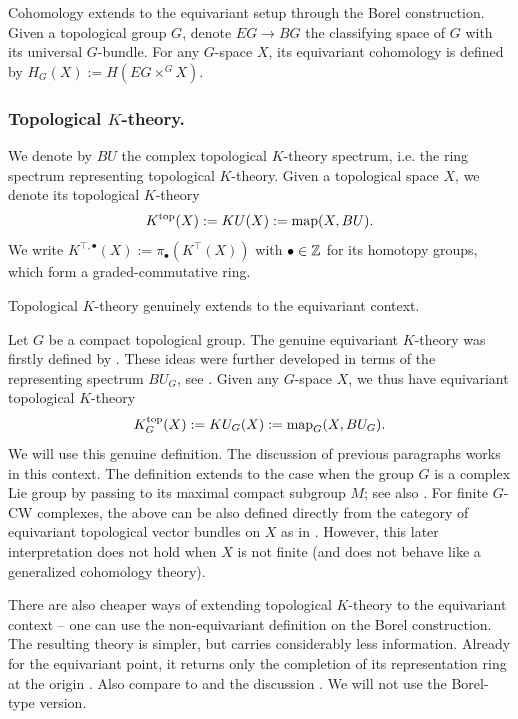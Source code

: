 Cohomology extends to the equivariant setup through the Borel construction. Given a topological group $G$, denote $EG \to BG$ the classifying space of $G$ with its universal $G$-bundle. For any $G$-space $X$, its equivariant cohomology is defined by $H_G(X) := H(EG \times^G X)$. 






\subsubsection{Topological $K$-theory.}
We denote by $BU$ the complex topological $K$-theory spectrum, i.e. the ring spectrum representing topological $K$-theory. Given a topological space $X$, we denote its topological $K$-theory
\begin{equation*}
    K^{\mathrm{top}}(X) := KU(X) := \operatorname{map}(X, BU).
\end{equation*}
We write $K^{\top, \bullet}(X) := \pi_{\bullet}(K^{\top}(X))$ with $\bullet \in \operatorname{\mathbb{Z}}$ for its homotopy groups, which form a graded-commutative ring.

Topological $K$-theory genuinely extends to the equivariant context. 
\begin{recollection}\label{recollection: genuine topological K-theory}
Let $G$ be a compact topological group. The genuine equivariant $K$-theory was firstly defined by \cite{Seg68}. These ideas were further developed in terms of the representing spectrum $BU_G$, see \cite[\S XIV, in particular \S XIV.3 and \S XIV.4]{May96}. Given any $G$-space $X$, we thus have equivariant topological $K$-theory
\begin{equation*}
    K^{\mathrm{top}}_G(X) := KU_G(X) := \operatorname{map}_G(X, BU_G).
\end{equation*}
We will use this genuine definition. The discussion of previous paragraphs works in this context. The definition extends to the case when the group $G$ is a complex Lie group by passing to its maximal compact subgroup $M$; see also \cite[\S 2.1.2]{HLP20}. For finite $G$-CW complexes, the above can be also defined directly from the category of equivariant topological vector bundles on $X$ as in \cite{Weib13}. However, this later interpretation does not hold when $X$ is not finite (and does not behave like a generalized cohomology theory).
\end{recollection}





\begin{remark}
There are also cheaper ways of extending topological $K$-theory to the equivariant context -- one can use the non-equivariant definition on the Borel construction. The resulting theory is simpler, but carries considerably less information. Already for the equivariant point, it returns only the completion of its representation ring at the origin \cite{AS69}.
Also compare to \cite{Tho86} and the discussion \cite[\S 5]{Tho88b}. We will not use the Borel-type version.  
\end{remark}




